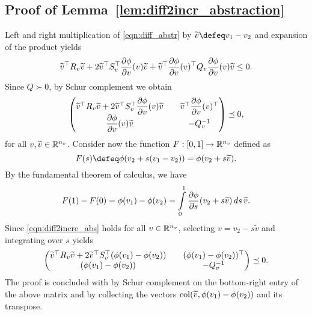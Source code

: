 \documentclass{ifacconf}
\begin{document}
\subsection{Proof of Lemma~\ref{lem:diff2incr_abstraction}} \label{sec:proof_lem2}
Left and right multiplication of \eqref{eqn:diff_abstr} by $\widetilde v \defeq v_1-v_2$ and expansion of the product yields
\[
\widetilde v^\top R_v\widetilde v + 2 \widetilde v^\top S_v^\top \dfrac{\partial \phi}{\partial v}(v)\widetilde v +\widetilde v^\top \dfrac{\partial \phi}{\partial v}(v)^\top Q_v \dfrac{\partial \phi}{\partial v}(v)\widetilde v \le 0.
\]
Since $Q\succ 0$, by Schur complement we obtain
\begin{equation}\label{eqn:diff2incre_abs}
\left(\begin{matrix}\widetilde v^\top R_v\widetilde v + 2 \widetilde v^\top S_v^\top \dfrac{\partial \phi}{\partial v}(v)\widetilde v && \widetilde v^\top \dfrac{\partial \phi}{\partial v}(v)^\top\\  \dfrac{\partial \phi}{\partial v}(v)\widetilde v && -Q_v^{-1}\end{matrix}\right) \preceq 0,
\end{equation}
for all $v,\widetilde v \in {\mathbb{R}}^{n_v}$.
Consider now the function $F:[0,1]\to{\mathbb{R}}^{n_v}$ defined as
\[
F(s) \defeq \phi(v_2+s(v_1-v_2)) = \phi(v_2+s\widetilde v).
\]
By the fundamental theorem of calculus, we have
\[
F(1)-F(0)=\phi(v_1)-\phi(v_2) = \int_0^1 \pderiv{\phi}{s}(v_2+s\widetilde v)\, ds \, \widetilde v.
\]
Since \eqref{eqn:diff2incre_abs} holds for all $v\in {\mathbb{R}}^{n_v}$, selecting $v = v_2-s\widetilde v$ and integrating over $s$ yields
\[
\left(\begin{matrix}\widetilde v^\top R_v\widetilde v + 2 \widetilde v^\top S_v^\top (\phi(v_1)-\phi(v_2)) &&  (\phi(v_1)-\phi(v_2))^\top\\   (\phi(v_1)-\phi(v_2)) && -Q_v^{-1}\end{matrix}\right) \preceq 0.
\]
The proof is concluded with by Schur complement on the bottom-right entry of the above matrix and by collecting the vectors $\operatorname{col}(\widetilde v, \phi(v_1)-\phi(v_2)) $ and its transpose.
\end{document}
